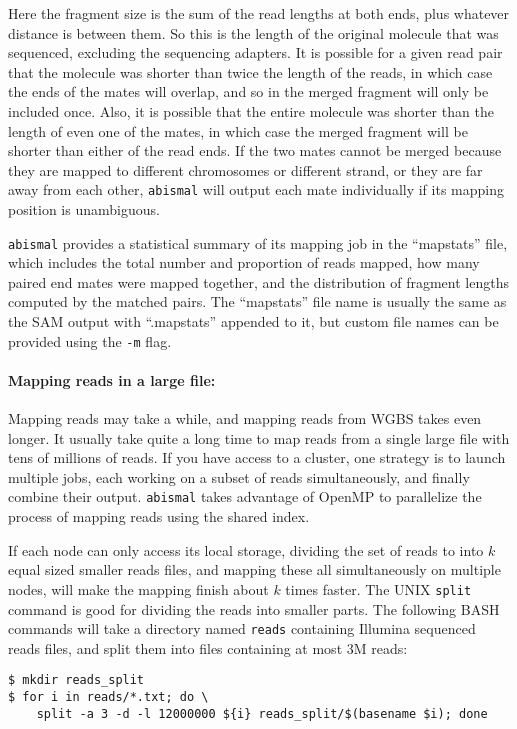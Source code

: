 \documentclass[10pt]{article}
\newcommand{\prog}[1]{\texttt{#1}}
\newcommand{\fn}[1]{\texttt{#1}}
\newcommand{\op}[1]{\texttt{#1}}
\begin{document}
Here the fragment size is the sum of the read lengths at
both ends, plus whatever distance is between them. So this is the
length of the original molecule that was sequenced, excluding the
sequencing adapters. It is possible for a given read pair that the
molecule was shorter than twice the length of the reads, in which case
the ends of the mates will overlap, and so in the merged fragment will
only be included once. Also, it is possible that the entire molecule
was shorter than the length of even one of the mates, in which case
the merged fragment will be shorter than either of the read ends. If
the two mates cannot be merged because they are mapped to different
chromosomes or different strand, or they are far away from each other,
\prog{abismal} will output each mate individually if its mapping
position is unambiguous.

\prog{abismal} provides a statistical summary
of its mapping job in the ``mapstats'' file, which includes the total
number and proportion of reads mapped, how many paired end mates were
mapped together, and the distribution of fragment lengths computed by
the matched pairs. The ``mapstats'' file name is usually the same as
the SAM output with ``.mapstats'' appended to it, but custom file
names can be provided using the \op{-m} flag.

\paragraph{Mapping reads in a large file:}
Mapping reads may take a while, and mapping reads from WGBS takes
even longer. It usually take quite a long time to map reads from a
single large file with tens of millions of reads. If you have access
to a cluster, one strategy is to launch multiple jobs, each working on
a subset of reads simultaneously, and finally combine their output.
\prog{abismal} takes advantage of OpenMP to parallelize the process of
mapping reads using the shared index.

If each node can only access its local storage, dividing the set of
reads to into $k$ equal sized smaller reads files, and mapping these
all simultaneously on multiple nodes, will make the mapping finish
about $k$ times faster.  The UNIX \prog{split} command is good for
dividing the reads into smaller parts. The following BASH commands
will take a directory named \fn{reads} containing Illumina sequenced
reads files, and split them into files containing at most 3M reads:

\begin{verbatim}
$ mkdir reads_split
$ for i in reads/*.txt; do \
    split -a 3 -d -l 12000000 ${i} reads_split/$(basename $i); done
\end{verbatim}
\end{document}
